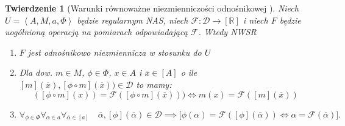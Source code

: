 \documentclass[12pt,a4paper]{report}
\newtheorem{tw}[definition]{Twierdzenie}
\newcommand{\domkniecie}[1]{\left[ {#1} \right] }
\newcommand{\tuple}[1]{\left\langle {#1} \right\rangle}
\begin{document}
\begin{tw}[Warunki równoważne niezmienniczości odnośnikowej {\citep[Tw. 1]{adams1965theory}}]
Niech $U=\tuple{A,M,a,\Phi}$ będzie regularnym NAS, niech $\mathcal{F}:\mathcal{D}\to \domkniecie{\mathbb{R}}$ i niech $F$ będzie uogólnioną operacją na pomiarach odpowiadającą $\mathcal{F}$. Wtedy
NWSR
\begin{enumerate}
\item
$F$ jest odnośnikowo niezmiennicza w stosunku do $U$
\item
Dla dow. $m \in M$, $\phi \in \Phi$, $ x \in A$ i $\overline{x} \in \domkniecie{A}$ o ile $\domkniecie{m}(\overline{x}), \domkniecie{\phi\circ m}(\overline{x})) \in \mathcal{D}$ to mamy:
$$
(\domkniecie{\phi\circ m}(x))=\mathcal{F}( \domkniecie{\phi \circ m}(\overline{x}))) \iff m(x)=\mathcal{F}(\domkniecie{m}(\overline{x}))
$$
\item
$$
\forall_{\phi \in \Phi}\forall_{\alpha \in a}\forall_{\overline{\alpha} \in \domkniecie{a}} \quad \overline{\alpha}, \domkniecie{\phi}(\overline{\alpha}) \in \mathcal{D} \implies \big[\phi(\alpha)=\mathcal{F}(\domkniecie{\phi}(\overline{\alpha})) \iff \alpha=\mathcal{F}(\overline{\alpha})\big].
$$
\end{enumerate}

\end{tw}
\end{document}
